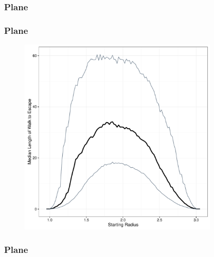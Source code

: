 \documentclass{beamer}
\begin{document}

\begin{frame}
	
	\frametitle{Plane}
	
	\begin{figure}
		
	\end{figure}
	
\end{frame}

\begin{frame}

	\frametitle{Plane}
	
	\begin{figure}
		\includegraphics[width=0.85\textwidth]{images/PlaneIn1Out3.pdf}
	\end{figure}

\end{frame}



\begin{frame}
	
	\frametitle{Plane}
	
	\begin{figure}
		
	\end{figure}
	
\end{frame}
\end{document}
